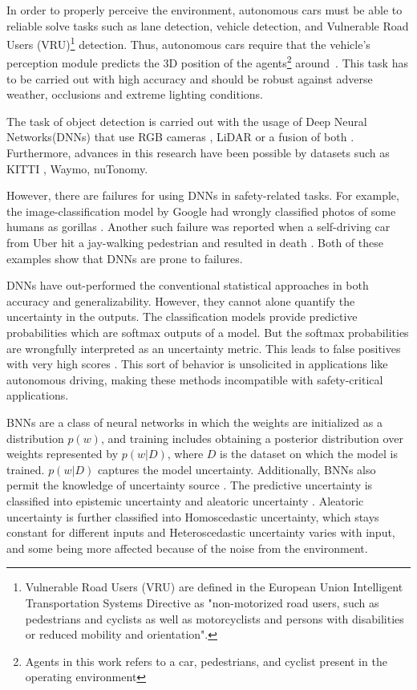 \documentclass[10pt,twocolumn,letterpaper]{article}
\begin{document}
In order to properly perceive the environment, autonomous cars must be able to reliable solve tasks such as lane detection, vehicle detection, and Vulnerable Road Users (VRU)\footnote{Vulnerable Road Users (VRU) are defined in the European Union Intelligent Transportation Systems Directive as "non-motorized road users, such as pedestrians and cyclists as well as motorcyclists and persons with disabilities or reduced mobility and orientation".} detection. Thus, autonomous cars require that the vehicle's perception module predicts the 3D position of the agents\footnote{Agents in this work refers to a car, pedestrians, and cyclist present in the operating environment} around~\cite{KITTI2012}. This task has to be carried out with high accuracy and should be robust against adverse weather, occlusions and extreme lighting conditions. 

The task of object detection is carried out with the usage of Deep Neural Networks(DNNs) \cite{Rao2018, Arnold2019} that use RGB cameras \cite{Chen2016, Mousavian2017, Chabot2017, Chen2017}, LiDAR \cite{VOTE3DEEP2017, Zhou2018, Sahba2019, Simon2018, Xiang2015} or a fusion of both \cite{Du2018, FPointnet2018, AVOD2018, FrustumConvnet2019}. Furthermore, advances in this research have been possible by datasets such as KITTI \cite{KITTI2012}, Waymo\cite{Waymo2019}, nuTonomy\cite{Caesar2020}.

However, there are failures for using DNNs in safety-related tasks. For example, \label{GoogleFailure} the image-classification model by Google had wrongly classified photos of some humans as gorillas \cite{Mulshine2015}. Another such failure was reported\label{Uberfailure} when a self-driving car from Uber hit a jay-walking pedestrian and resulted in death \cite{SLJCW2018}. Both of these examples show that DNNs are prone to failures. 

DNNs have out-performed the conventional statistical approaches in both accuracy and generalizability. However, they cannot alone quantify the uncertainty in the outputs. The classification models provide predictive probabilities which are softmax outputs of a model. But the softmax probabilities are wrongfully interpreted as an uncertainty metric. This leads to false positives with very high scores \cite{Blundell2015, Malinin2018}. This sort of behavior is unsolicited in applications like autonomous driving, making these methods incompatible with safety-critical applications. 

BNNs \cite{tran2016edward, Shridhar2018, Tran2019} are a class of neural networks in which the weights are initialized as a distribution $p(w)$, and training includes obtaining a posterior distribution over weights represented by $p (w|D)$, where $D$ is the dataset on which the model is trained. $p (w|D)$ captures the model uncertainty. Additionally, BNNs also permit the knowledge of uncertainty source \cite{Henne2020}. The predictive uncertainty is classified into epistemic uncertainty and aleatoric uncertainty \cite{Kendall2017}. Aleatoric uncertainty is further classified into Homoscedastic uncertainty, which stays constant for different inputs and Heteroscedastic uncertainty varies with input, and some being more affected because of the noise from the environment.
\end{document}
